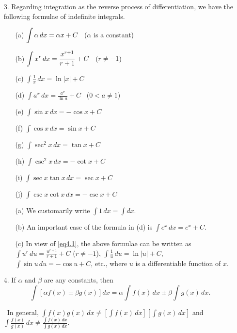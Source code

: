 \documentclass[12pt]{article}
\newenvironment{note}{\noindent{\bf Note }}{\vspace{0mm}}
\newenvironment{notes}{\noindent{\bf Notes }}{\vspace{0mm}}
\newcommand{\ds}{\displaystyle}
\begin{document}
\begin{enumerate}
\item[3.]
Regarding integration as the reverse process of differentiation, we have the following formulae of indefinite integrals.
\begin{enumerate}
\item[(a)]
$\scriptsize \ds \int \alpha \, dx = \alpha x + C$ \, ($\alpha$ is a constant)
\item[(b)]
$\small \ds \int x^r \, dx = \frac{x^{r+1}}{r+1} + C$ \, ($r \ne -1$)
\item[(c)]
$\ds \int \frac{1}{x} \, dx = \ln|x| + C$
\item[(d)]
$\ds \int a^x \, dx = \frac{a^x}{\ln a} + C$ \, ($0 < a \ne 1$)
\item[(e)]
$\ds \int \sin x \, dx = -\cos x + C$
\item[(f)]
$\ds \int \cos x \, dx = \sin x + C$
\item[(g)]
$\ds \int \sec^2 x \, dx = \tan x + C$
\item[(h)]
$\ds \int \csc^2 x \, dx = -\cot x + C$
\item[(i)]
$\ds \int \sec x\tan x \, dx = \sec x + C$
\item[(j)]
$\ds \int \csc x\cot x \, dx = -\csc x + C$
\end{enumerate}

\vspace{0.2cm}

\begin{notes}
\begin{enumerate}
\item[(a)]
We customarily write $\ds \int 1 \, dx = \int dx$.
\item[(b)]
An important case of the formula in (d) is $\ds \int e^x \, dx = e^x + C$.
\item[(c)]
In view of \eqref{eq4.1}, the above formulae can be written as $\ds \int u^r \, du = \frac{u^{r+1}}{r+1} + C$ ($r \ne -1$), $\ds \int \frac{1}{u}\,du = \ln|u| + C$, $\ds \int \sin u \, du = -\cos u + C$, etc., where $u$ is a differentiable function of $x$.
\end{enumerate}
\end{notes}

\item[4.]
If $\alpha$ and $\beta$ are any constants, then
$$
\int \left[\alpha f(x) \pm \beta g(x)\right] dx = \alpha\int f(x) \, dx \pm \beta\int g(x) \, dx.
$$

\begin{note}
\, In general, $\ds \int f(x)g(x) \, dx \ne \left[\ds \int f(x) \, dx\right]\left[\ds \int g(x) \, dx\right]$ and $\ds \int \frac{f(x)}{g(x)} \, dx \ne \frac{\ds \int f(x) \, dx}{\ds \int g(x) \, dx}$.
\end{note}


\end{enumerate}
\end{document}
